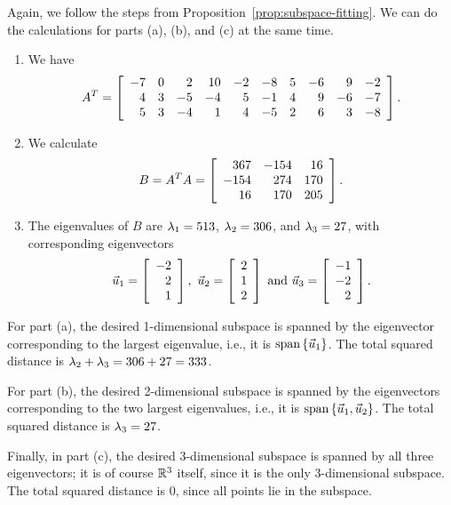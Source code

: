\documentclass{ximera}
\begin{document}
\begin{solution}
  Again, we follow the steps from
  Proposition~\ref{prop:subspace-fitting}. We can do the calculations
  for parts (a), (b), and (c) at the same time.
  \begin{enumerate}
  \item We have
    \begin{equation*}
      A^T = \startmat{rrrrrrrrrr}
        -7 & 0 & 2 & 10 & -2 & -8 & 5 & -6 & 9 & -2 \\
        4 & 3 & -5 & -4 & 5 & -1 & 4 & 9 & -6 & -7 \\
        5 & 3 & -4 & 1 & 4 & -5 & 2 & 6 & 3 & -8 \\
      \stopmat.
    \end{equation*}
  \item We calculate
    \begin{equation*}
      B = A^TA = \startmat{rrr}
        367 & -154 & 16 \\
        -154 & 274 & 170 \\
        16 & 170 & 205 \\
      \stopmat.
    \end{equation*}
  \item The eigenvalues of $B$ are $\eigenvar_1 = 513$,
    $\eigenvar_2 = 306$, and $\eigenvar_3 = 27$, with corresponding
    eigenvectors
    \begin{equation*}
      \vect{u}_1 = \startmat{r} -2 \\ 2 \\ 1 \stopmat,
      \quad
      \vect{u}_2 = \startmat{r} 2 \\ 1 \\ 2 \stopmat
      \quad\mbox{and}\quad
      \vect{u}_3 = \startmat{r} -1 \\ -2 \\ 2 \stopmat.
    \end{equation*}
  \end{enumerate}

  For part (a), the desired 1-dimensional subspace is spanned by the
  eigenvector corresponding to the largest eigenvalue, i.e., it is
  $\sspan\set{\vect{u}_1}$. The total squared distance is
  $\eigenvar_2+\eigenvar_3 = 306 + 27 = 333$.

  For part (b), the desired 2-dimensional subspace is spanned by the
  eigenvectors corresponding to the two largest eigenvalues, i.e., it
  is $\sspan\set{\vect{u}_1,\vect{u}_2}$. The total squared distance is
  $\eigenvar_3 = 27$.

  Finally, in part (c), the desired 3-dimensional subspace is spanned
  by all three eigenvectors; it is of course $\R^3$ itself, since it
  is the only 3-dimensional subspace. The total squared distance is
  $0$, since all points lie in the subspace.
\end{solution}
\end{document}
